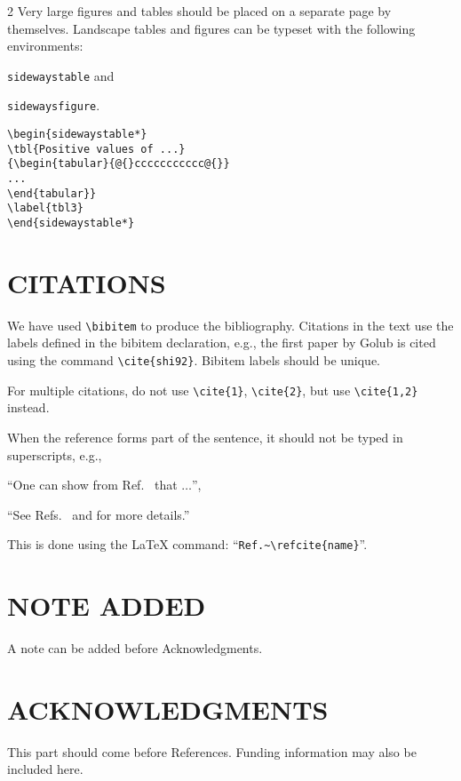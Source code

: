 \documentclass{ws-bme}
\begin{document}
\begin{multicols}{2}
Very large figures and tables should be placed on a separate page
by themselves. Landscape tables and figures can be typeset with the following environments:

\begin{itemlist}
\item \verb|sidewaystable| and
\item \verb|sidewaysfigure|.
\end{itemlist}


\begin{verbatim}
\begin{sidewaystable*}
\tbl{Positive values of ...}
{\begin{tabular}{@{}ccccccccccc@{}}
...
\end{tabular}}
\label{tbl3}
\end{sidewaystable*}
\end{verbatim}

\section*{CITATIONS}
We have used \verb|\bibitem| to produce the bibliography. Citations
in the text use the labels defined in the bibitem declaration, e.g.,
the first paper by Golub\cite{shi92} is cited using the command
\verb|\cite{shi92}|. Bibitem labels should be unique.

For multiple citations, do not use \verb|\cite{1}|, \verb|\cite{2}|, but use
\verb|\cite{1,2}| instead.

When the reference forms part of the sentence, it should not be
typed in superscripts, e.g.,

\begin{itemlist}
\item ``One can show from Ref.~ that $\ldots$'',\break
\item ``See Refs.~ and  for more details.''
\end{itemlist}

This is done using the LaTeX command: ``\verb|Ref.~\refcite{name}|''.

\section*{NOTE ADDED}
A note can be added before Acknowledgments.

\section*{ACKNOWLEDGMENTS}
This part should come before References.
Funding information may also be included here.


\end{multicols}
\end{document}
